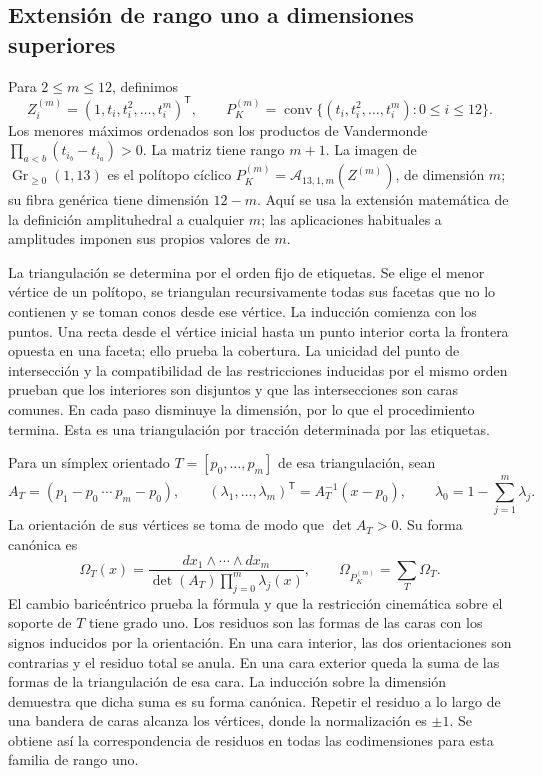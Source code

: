 \documentclass[a4paper,10pt]{article}
\theoremstyle{definition}\newtheorem{definition}[theorem]{Definición}
\theoremstyle{remark}\newtheorem{remark}[theorem]{Observación}
\numberwithin{equation}{section}
\begin{document}
\subsection{Extensión de rango uno a dimensiones superiores}

Para \(2\leq m\leq12\), definimos
\begin{equation}
 Z_i^{(m)}=(1,t_i,t_i^2,\ldots,t_i^m)^\mathsf T,\qquad
 P_K^{(m)}=\operatorname{conv}
 \{(t_i,t_i^2,\ldots,t_i^m):0\leq i\leq12\}.
 \label{eq:polygon-higher-lift}
\end{equation}
Los menores máximos ordenados son los productos de Vandermonde
\(\prod_{a<b}(t_{i_b}-t_{i_a})>0\). La matriz tiene rango \(m+1\).
La imagen de \(\operatorname{Gr}_{\geq0}(1,13)\) es el polítopo cíclico
\(P_K^{(m)}=\mathcal A_{13,1,m}(Z^{(m)})\), de dimensión \(m\); su fibra
genérica tiene dimensión \(12-m\). Aquí se usa la extensión matemática
de la definición amplituhedral a cualquier \(m\); las aplicaciones
habituales a amplitudes imponen sus propios valores de \(m\).

La triangulación se determina por el orden fijo de etiquetas. Se elige
el menor vértice de un polítopo, se triangulan recursivamente todas sus
facetas que no lo contienen y se toman conos desde ese vértice. La
inducción comienza con los puntos. Una recta desde el vértice inicial
hasta un punto interior corta la frontera opuesta en una faceta; ello
prueba la cobertura. La unicidad del punto de intersección y la
compatibilidad de las restricciones inducidas por el mismo orden prueban
que los interiores son disjuntos y que las intersecciones son caras
comunes. En cada paso disminuye la dimensión, por lo que el procedimiento
termina. Esta es una triangulación por tracción determinada por las
etiquetas.

Para un símplex orientado
\(T=[p_0,\ldots,p_m]\) de esa triangulación, sean
\[
 A_T=(p_1-p_0\ \cdots\ p_m-p_0),\qquad
 (\lambda_1,\ldots,\lambda_m)^\mathsf T=A_T^{-1}(x-p_0),
 \qquad\lambda_0=1-\sum_{j=1}^m\lambda_j.
\]
La orientación de sus vértices se toma de modo que \(\det A_T>0\).
Su forma canónica es
\begin{equation}
 \Omega_T(x)=
 \frac{dx_1\wedge\cdots\wedge dx_m}
 {\det(A_T)\prod_{j=0}^m\lambda_j(x)},\qquad
 \Omega_{P_K^{(m)}}=\sum_{T}\Omega_T.
 \label{eq:polygon-higher-form}
\end{equation}
El cambio baricéntrico prueba la fórmula y que la restricción cinemática
sobre el soporte de \(T\) tiene grado uno. Los residuos son las formas
de las caras con los signos inducidos por la orientación. En una cara
interior, las dos orientaciones son contrarias y el residuo total se
anula. En una cara exterior queda la suma de las formas de la
triangulación de esa cara. La inducción sobre la dimensión demuestra
que dicha suma es su forma canónica. Repetir el residuo a lo largo de
una bandera de caras alcanza los vértices, donde la normalización es
\(\pm1\). Se obtiene así la correspondencia de residuos en todas las
codimensiones para esta familia de rango uno.
\end{document}
